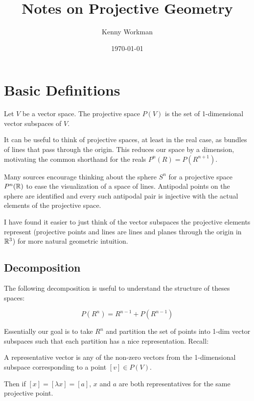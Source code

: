\documentclass[10pt]{article}
\title{Notes on Projective Geometry}
\author{Kenny Workman}
\date{\today}
\begin{document}
\maketitle

\section{Basic Definitions}

\begin{definition}
	Let $V$ be a vector space. The projective space $P(V)$ is the set of 1-dimensional vector subspaces of $V$.
\end{definition}

It can be useful to think of projective spaces, at least in the real case, as
bundles of lines that pass through the origin. This reduces our space by a
dimension, motivating the common shorthand for the reals $P^n(R) = P(R^{n+1})$. 

Many sources encourage thinking about the sphere $S^n$ for a projective space
$P^n(\mathbb{R})$ to ease the visualization of a space of lines. Antipodal points on
the sphere are identified and every such antipodal pair is injective with the
actual elements of the projective space. 

I have found it easier to just think of the vector subspaces the projective
elements represent (projective points and lines are lines and planes through the
origin in $\mathbb{R}^3$) for more natural geometric intuition.

\subsection{Decomposition}

The following decomposition is useful to understand the structure of theses spaces:

\[P(R^n) = R^{n-1} + P(R^{n-1}) \]

Essentially our goal is to take $R^n$ and partition the set of points into
1-dim vector subspaces such that each partition has a nice representation.
Recall:

\begin{definition}
	A representative vector is any of the non-zero vectors from the 1-dimensional subspace corresponding to a point $[v] \in P(V)$.
\end{definition}

Then if $[x] = [\lambda x] = [a]$, $x$ and $a$ are both representatives for the same projective point.
\end{document}
